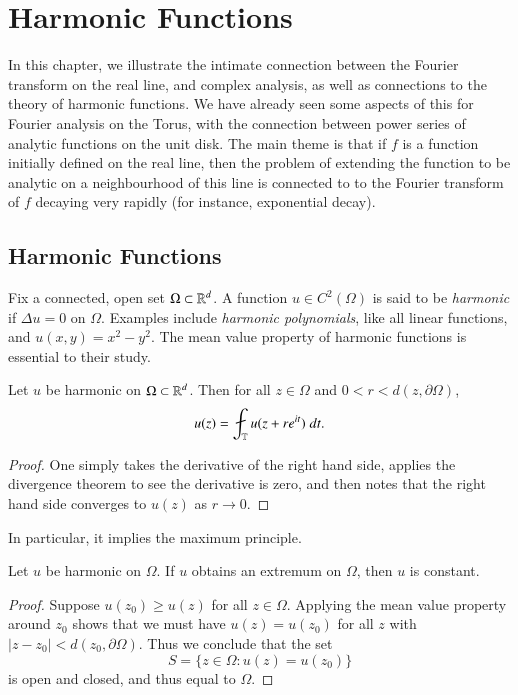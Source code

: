 \chapter{Harmonic Functions}

In this chapter, we illustrate the intimate connection between the Fourier transform on the real line, and complex analysis, as well as connections to the theory of harmonic functions. We have already seen some aspects of this for Fourier analysis on the Torus, with the connection between power series of analytic functions on the unit disk. The main theme is that if $f$ is a function initially defined on the real line, then the problem of extending the function to be analytic on a neighbourhood of this line is connected to to the Fourier transform of $f$ decaying very rapidly (for instance, exponential decay).

\section{Harmonic Functions}

Fix a connected, open set $\Omega \subset \operatorname{\mathbb{R}}^d$. A function $u \in C^2(\Omega)$ is said to be \emph{harmonic} if $\Delta u = 0$ on $\Omega$. Examples include \emph{harmonic polynomials}, like all linear functions, and $u(x,y) = x^2 - y^2$. The mean value property of harmonic functions is essential to their study.

\begin{theorem}
    Let $u$ be harmonic on $\Omega \subset \operatorname{\mathbb{R}}^d$. Then for all $z \in \Omega$ and $0 < r < d(z, \partial \Omega)$,
    \[ u(z) = \fint_{\TT} u(z + r e^{it})\; dt. \]
\end{theorem}
\begin{proof}
    One simply takes the derivative of the right hand side, applies the divergence theorem to see the derivative is zero, and then notes that the right hand side converges to $u(z)$ as $r \to 0$.
\end{proof}

In particular, it implies the maximum principle.

\begin{theorem}
    Let $u$ be harmonic on $\Omega$. If $u$ obtains an extremum on $\Omega$, then $u$ is constant.
\end{theorem}
\begin{proof}
    Suppose $u(z_0) \geq u(z)$ for all $z \in \Omega$. Applying the mean value property around $z_0$ shows that we must have $u(z) = u(z_0)$ for all $z$ with $|z - z_0| < d(z_0, \partial \Omega)$. Thus we conclude that the set
    \[ S = \{ z \in \Omega: u(z) = u(z_0) \} \]
    is open and closed, and thus equal to $\Omega$.
\end{proof}

